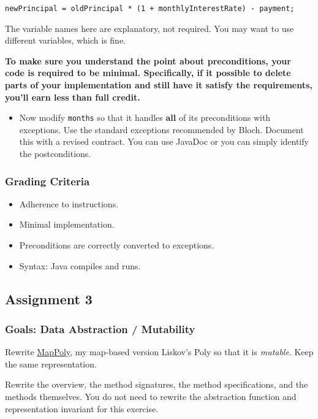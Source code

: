 \documentclass[11pt]{article}
\begin{document}
\begin{verbatim}
newPrincipal = oldPrincipal * (1 + monthlyInterestRate) - payment;
\end{verbatim}


The variable names here are explanatory, not required. You may want to use different variables, which is fine.

\textbf{To make sure you understand the point about preconditions, your code is required to be minimal. Specifically, if it possible to delete parts of your implementation and still have it satisfy the requirements, you'll earn less than full credit.}

\begin{itemize}
\item Now modify \texttt{months} so that it handles \textbf{all} of its preconditions with exceptions. Use the standard exceptions recommended by Bloch. Document this with a revised contract. You can use JavaDoc or you can simply identify the postconditions.
\end{itemize}

\subsubsection{Grading Criteria}
\label{sec:org494b8f3}

\begin{itemize}
\item Adherence to instructions.
\item Minimal implementation.
\item Preconditions are correctly converted to exceptions.
\item Syntax: Java compiles and runs.
\end{itemize}

\subsection{Assignment 3}
\label{sec:org853ad5b}
\subsubsection{Goals: Data Abstraction / Mutability}
\label{sec:org7a3303f}

Rewrite \href{./files/MapPoly.java}{MapPoly}, my map-based version Liskov's Poly so that it is \emph{mutable}. Keep the same representation.

Rewrite the overview, the method signatures, the method specifications, and the methods themselves. You do not need to rewrite the abstraction function and representation invariant for this exercise.
\end{document}
